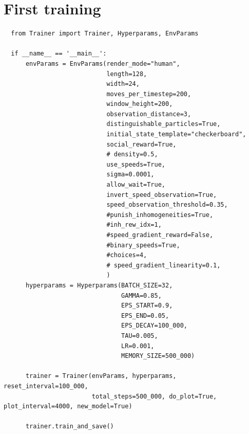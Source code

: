 \section{First training}
\label{app:first_training}
\begin{verbatim}
  from Trainer import Trainer, Hyperparams, EnvParams

  if __name__ == '__main__':
      envParams = EnvParams(render_mode="human",
                            length=128,
                            width=24,
                            moves_per_timestep=200,
                            window_height=200,
                            observation_distance=3,
                            distinguishable_particles=True,
                            initial_state_template="checkerboard",
                            social_reward=True,
                            # density=0.5,
                            use_speeds=True,
                            sigma=0.0001,
                            allow_wait=True,
                            invert_speed_observation=True,
                            speed_observation_threshold=0.35,
                            #punish_inhomogeneities=True,
                            #inh_rew_idx=1,
                            #speed_gradient_reward=False,
                            #binary_speeds=True,
                            #choices=4,
                            # speed_gradient_linearity=0.1,
                            )
      hyperparams = Hyperparams(BATCH_SIZE=32,
                                GAMMA=0.85,
                                EPS_START=0.9,
                                EPS_END=0.05,
                                EPS_DECAY=100_000,
                                TAU=0.005,
                                LR=0.001,
                                MEMORY_SIZE=500_000)
  
      trainer = Trainer(envParams, hyperparams, reset_interval=100_000,
                        total_steps=500_000, do_plot=True, plot_interval=4000, new_model=True)
  
      trainer.train_and_save()
\end{verbatim}

